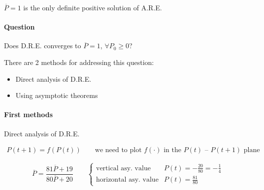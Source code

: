\begin{exercise}
    $\overline{P}=1$ is the only definite positive solution of A.R.E.

    \paragraph{Question} Does D.R.E. converges to $\overline{P}=1$, $\forall P_0 \ge 0$?

    There are 2 methods for addressing this question:
    \begin{itemize}
        \item Direct analysis of D.R.E.
        \item Using asymptotic theorems
    \end{itemize}

    \paragraph{First methods} Direct analysis of D.R.E.

    \begin{align*}
        P(t+1) = f(P(t)) \qquad \text{we need to plot $f(\cdot)$ in the $P(t)$ -- $P(t+1)$ plane}
    \end{align*}

    \[
        \overline{P} = \frac{81\overline{P} + 19}{80\overline{P}+20}
        \qquad
        \begin{cases}
            \text{vertical asy. value} & P(t) = -\frac{20}{80} = -\frac{1}{4} \\
            \text{horizontal asy. value} & P(t) = \frac{81}{80}
        \end{cases}
    \]

    \begin{figure}[H]
        \centering
\end{figure}
\end{exercise}
